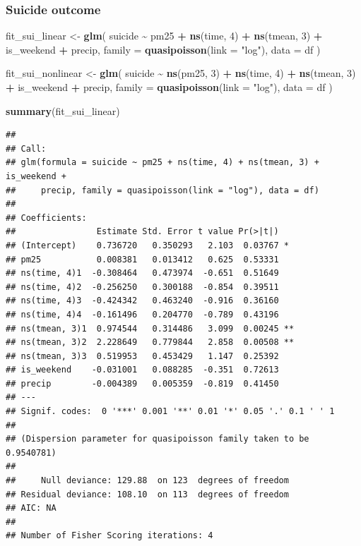 \documentclass[
]{article}
\newenvironment{Shaded}{\begin{snugshade}}{\end{snugshade}}
\newcommand{\AttributeTok}[1]{\textcolor[rgb]{0.13,0.29,0.53}{#1}}
\newcommand{\DecValTok}[1]{\textcolor[rgb]{0.00,0.00,0.81}{#1}}
\newcommand{\FunctionTok}[1]{\textcolor[rgb]{0.13,0.29,0.53}{\textbf{#1}}}
\newcommand{\NormalTok}[1]{#1}
\newcommand{\OtherTok}[1]{\textcolor[rgb]{0.56,0.35,0.01}{#1}}
\newcommand{\SpecialCharTok}[1]{\textcolor[rgb]{0.81,0.36,0.00}{\textbf{#1}}}
\newcommand{\StringTok}[1]{\textcolor[rgb]{0.31,0.60,0.02}{#1}}
\begin{document}
\subsubsection{Suicide outcome}\label{suicide-outcome}

\begin{Shaded}
\begin{Highlighting}[]
\NormalTok{fit\_sui\_linear }\OtherTok{\textless{}{-}} \FunctionTok{glm}\NormalTok{(}
\NormalTok{  suicide }\SpecialCharTok{\textasciitilde{}}\NormalTok{ pm25 }\SpecialCharTok{+} \FunctionTok{ns}\NormalTok{(time, }\DecValTok{4}\NormalTok{) }\SpecialCharTok{+} \FunctionTok{ns}\NormalTok{(tmean, }\DecValTok{3}\NormalTok{) }\SpecialCharTok{+}\NormalTok{ is\_weekend }\SpecialCharTok{+}\NormalTok{ precip,}
  \AttributeTok{family =} \FunctionTok{quasipoisson}\NormalTok{(}\AttributeTok{link =} \StringTok{"log"}\NormalTok{),}
  \AttributeTok{data =}\NormalTok{ df}
\NormalTok{)}

\NormalTok{fit\_sui\_nonlinear }\OtherTok{\textless{}{-}} \FunctionTok{glm}\NormalTok{(}
\NormalTok{  suicide }\SpecialCharTok{\textasciitilde{}} \FunctionTok{ns}\NormalTok{(pm25, }\DecValTok{3}\NormalTok{) }\SpecialCharTok{+} \FunctionTok{ns}\NormalTok{(time, }\DecValTok{4}\NormalTok{) }\SpecialCharTok{+} \FunctionTok{ns}\NormalTok{(tmean, }\DecValTok{3}\NormalTok{) }\SpecialCharTok{+}\NormalTok{ is\_weekend }\SpecialCharTok{+}\NormalTok{ precip,}
  \AttributeTok{family =} \FunctionTok{quasipoisson}\NormalTok{(}\AttributeTok{link =} \StringTok{"log"}\NormalTok{),}
  \AttributeTok{data =}\NormalTok{ df}
\NormalTok{)}

\FunctionTok{summary}\NormalTok{(fit\_sui\_linear)}
\end{Highlighting}
\end{Shaded}

\begin{verbatim}
## 
## Call:
## glm(formula = suicide ~ pm25 + ns(time, 4) + ns(tmean, 3) + is_weekend + 
##     precip, family = quasipoisson(link = "log"), data = df)
## 
## Coefficients:
##                Estimate Std. Error t value Pr(>|t|)   
## (Intercept)    0.736720   0.350293   2.103  0.03767 * 
## pm25           0.008381   0.013412   0.625  0.53331   
## ns(time, 4)1  -0.308464   0.473974  -0.651  0.51649   
## ns(time, 4)2  -0.256250   0.300188  -0.854  0.39511   
## ns(time, 4)3  -0.424342   0.463240  -0.916  0.36160   
## ns(time, 4)4  -0.161496   0.204770  -0.789  0.43196   
## ns(tmean, 3)1  0.974544   0.314486   3.099  0.00245 **
## ns(tmean, 3)2  2.228649   0.779844   2.858  0.00508 **
## ns(tmean, 3)3  0.519953   0.453429   1.147  0.25392   
## is_weekend    -0.031001   0.088285  -0.351  0.72613   
## precip        -0.004389   0.005359  -0.819  0.41450   
## ---
## Signif. codes:  0 '***' 0.001 '**' 0.01 '*' 0.05 '.' 0.1 ' ' 1
## 
## (Dispersion parameter for quasipoisson family taken to be 0.9540781)
## 
##     Null deviance: 129.88  on 123  degrees of freedom
## Residual deviance: 108.10  on 113  degrees of freedom
## AIC: NA
## 
## Number of Fisher Scoring iterations: 4
\end{verbatim}
\end{document}
